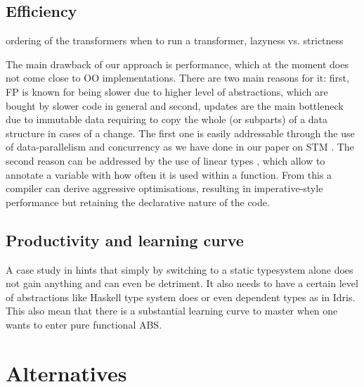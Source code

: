 

\subsection{Efficiency}
ordering of the transformers
when to run a transformer,
lazyness vs. strictness

The main drawback of our approach is performance, which at the moment does not come close to OO implementations. There are two main reasons for it: first, FP is known for being slower due to higher level of abstractions, which are bought by slower code in general and second, updates are the main bottleneck due to immutable data requiring to copy the whole (or subparts) of a data structure in cases of a change. The first one is easily addressable through the use of data-parallelism and concurrency as we have done in our paper on STM \cite{thaler_tale_2018}. The second reason can be addressed by the use of linear types \cite{bernardy_linear_2017}, which allow to annotate a variable with how often it is used within a function. From this a compiler can derive aggressive optimisations, resulting in imperative-style performance but retaining the declarative nature of the code.

\subsection{Productivity and learning curve}
A case study in \cite{hanenberg_experiment_2010} hints that simply by switching to a static typesystem alone does not gain anything and can even be detriment. It also needs to have a certain level of abstractions like Haskell type system does or even dependent types as in Idris. This also mean that there is a substantial learning curve to master when one wants to enter pure functional ABS.

\section{Alternatives}
